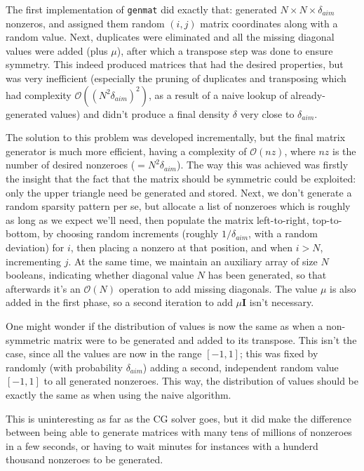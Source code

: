 \documentclass[a4paper]{article}
\newcommand{\mat}[1]{\ensuremath{\boldsymbol{#1}}}
\begin{document}
The first implementation of \texttt{genmat} did exactly that: generated $N\times N \times \delta_{aim}$
nonzeros, and assigned them random $(i,j)$ matrix coordinates along with a random value. Next, duplicates
were eliminated and all the missing diagonal values were added (plus $\mu$), after which a transpose step
was done to ensure symmetry. This indeed produced matrices that had the desired properties, but
was very inefficient (especially the pruning of duplicates and
transposing which had complexity $\ensuremath{\mathcal{O}}( (N^2\delta_{aim})^2 )$, as a result of a naive lookup of already-generated values)
and didn't produce a final density $\delta$ very close to $\delta_{aim}$.

The solution to this problem was developed incrementally, but the final matrix generator is much more efficient,
having a complexity of $\ensuremath{\mathcal{O}}(nz)$, where $nz$ is the number of desired nonzeroes ($=N^2\delta_{aim}$). The way this
was achieved was firstly the insight that the fact that the matrix should be symmetric could be exploited: only
the upper triangle need be generated and stored. Next, we don't generate a random sparsity pattern per se, but allocate
a list of nonzeroes which is roughly as long as we expect we'll need, then populate the matrix left-to-right, top-to-bottom,
by choosing random increments (roughly $1/\delta_{aim}$, with a random
deviation) for $i$, then placing a nonzero at that position, and when $i>N$,
incrementing $j$. At the same time, we maintain an auxiliary array of size $N$ booleans,
indicating whether diagonal value $N$ has been generated, so that afterwards it's an $\ensuremath{\mathcal{O}}(N)$ operation
to add missing diagonals. The value $\mu$ is also added in the first phase, so a second iteration to add $\mu\mat I$ isn't
necessary.

One might wonder if the distribution of values is now the same as when a non-symmetric matrix were
to be generated and added to its transpose. This isn't the case, since all the values are now in the
range $[-1,1]$; this was fixed by randomly (with probability $\delta_{aim}$) adding a second, independent random
value $[-1,1]$ to all generated nonzeroes. This way, the distribution of values should be exactly the same as when
using the naive algorithm.

This is uninteresting as far as the CG solver goes, but it did make the difference between being able to generate matrices
with many tens of millions of nonzeroes in a few seconds, or having to wait minutes for instances with a hunderd thousand
nonzeroes to be generated.
\end{document}

